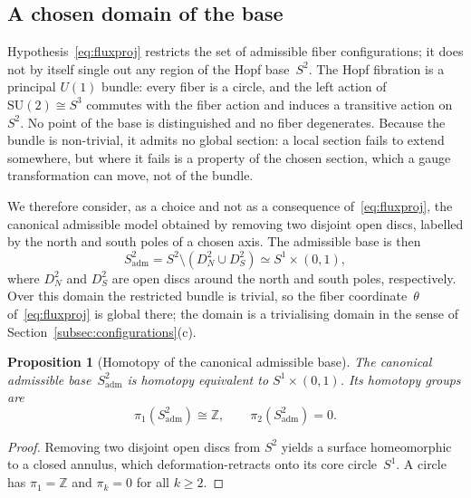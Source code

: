 \documentclass[11pt,a4paper]{article}
\newtheorem{proposition}[theorem]{Proposition}
\begin{document}
    \subsection{A chosen domain of the base}

      Hypothesis~\eqref{eq:fluxproj} restricts the set of admissible fiber
      configurations; it does not by itself single out any region of the
      Hopf base~$S^2$.
      The Hopf fibration is a principal $U(1)$ bundle: every fiber is a
      circle, and the left action of $\mathrm{SU}(2) \cong S^3$ commutes with
      the fiber action and induces a transitive action on~$S^2$.
      No point of the base is distinguished and no fiber degenerates.
      Because the bundle is non-trivial, it admits no global section: a local
      section fails to extend somewhere, but where it fails is a property of
      the chosen section, which a gauge transformation can move, not of the
      bundle.

      We therefore consider, as a choice and not as a consequence
      of~\eqref{eq:fluxproj}, the canonical admissible model obtained by
      removing two disjoint open discs, labelled by the north and south poles
      of a chosen axis.
      The admissible base is then
      \begin{equation}
        \label{eq:annulus}
        S^2_{\mathrm{adm}}
        = S^2 \setminus (D^2_N \cup D^2_S)
        \simeq S^1 \times (0,1),
      \end{equation}
      where $D^2_N$ and $D^2_S$ are open discs around the north and south
      poles, respectively.
      Over this domain the restricted bundle is trivial, so the fiber
      coordinate~$\theta$ of~\eqref{eq:fluxproj} is global there; the domain is
      a trivialising domain in the sense of
      Section~\ref{subsec:configurations}(c).

      \begin{proposition}[Homotopy of the canonical admissible base]
        \label{prop:homotopy}
        The canonical admissible base~$S^2_{\mathrm{adm}}$ is homotopy
        equivalent to $S^1 \times (0,1)$.
        Its homotopy groups are
        \begin{equation}
          \label{eq:homotopyadm}
          \pi_1(S^2_{\mathrm{adm}}) \cong \mathbb{Z},
          \qquad
          \pi_2(S^2_{\mathrm{adm}}) = 0.
        \end{equation}
      \end{proposition}

      \begin{proof}
        Removing two disjoint open discs from $S^2$ yields a surface
        homeomorphic to a closed annulus, which deformation-retracts onto
        its core circle~$S^1$.
        A circle has $\pi_1 = \mathbb{Z}$ and $\pi_k = 0$ for all $k \geq 2$.
      \end{proof}
\end{document}
